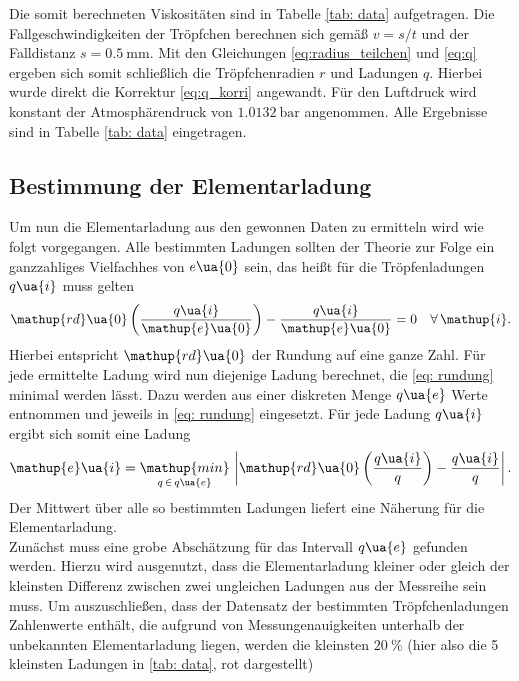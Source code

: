 Die somit berechneten Viskositäten sind in Tabelle \ref{tab: data} aufgetragen.
Die Fallgeschwindigkeiten der Tröpfchen berechnen sich gemäß $v = s/t$ und der Falldistanz $s = \SI{0.5}{\milli\meter}$.
Mit den Gleichungen \eqref{eq:radius_teilchen} und \eqref{eq:q} ergeben sich somit schließlich die Tröpfchenradien $r$ und Ladungen $q$. Hierbei wurde
direkt die Korrektur \eqref{eq:q_korri} angewandt. Für den Luftdruck wird konstant der Atmosphärendruck von
$\SI{1.0132}{\bar}$ angenommen. Alle Ergebnisse sind in Tabelle \ref{tab: data} eingetragen. \\


\subsection{Bestimmung der Elementarladung}
Um nun die Elementarladung aus den gewonnen Daten zu ermitteln wird wie folgt vorgegangen. Alle bestimmten
Ladungen sollten der Theorie zur Folge ein ganzzahliges Vielfachhes von $e\ua{0}$ sein, das heißt für die %
Tröpfenladungen $q\ua{i}$ muss gelten
\begin{equation}
  \mathup{rd}\ua{0}\left(\frac{q\ua{i}}{\mathup{e}\ua{0}}\right) - \frac{q\ua{i}}{\mathup{e}\ua{0}} = 0 \quad \forall\, \mathup{i}.
  \label{eq: rundung}
\end{equation}
Hierbei entspricht $\mathup{rd}\ua{0}$ der Rundung auf eine ganze Zahl. Für jede ermittelte Ladung wird nun diejenige
Ladung berechnet, die \eqref{eq: rundung} minimal werden lässt. Dazu werden aus einer diskreten Menge $q\ua{e}$ Werte entnommen
und jeweils in \eqref{eq: rundung} eingesetzt. Für jede Ladung $q\ua{i}$ ergibt sich somit eine Ladung
\begin{equation}
  \mathup{e}\ua{i} = \underset{q\, \in \,q\ua{e}}{\mathup{min}}\, \left|\mathup{rd}\ua{0}\left(\frac{q\ua{i}}{q}\right) - \frac{q\ua{i}}{q}\right|.
\end{equation}
Der Mittwert über alle so bestimmten Ladungen liefert eine Näherung für die Elementarladung.\\
Zunächst muss eine grobe Abschätzung für das Intervall $q\ua{e}$ gefunden werden. Hierzu wird ausgenutzt, dass die Elementarladung
kleiner oder gleich der kleinsten Differenz zwischen zwei ungleichen Ladungen aus der Messreihe sein muss. Um auszuschließen, dass
der Datensatz der bestimmten Tröpfchenladungen Zahlenwerte enthält, die aufgrund von Messungenauigkeiten unterhalb
der unbekannten Elementarladung liegen, werden die kleinsten $\SI{20}{\percent}$ (hier also die 5 kleinsten Ladungen in \ref{tab: data}, rot dargestellt)
